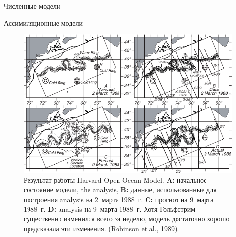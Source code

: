 \begin{chapter}{Численные модели}
\begin{section}{Ассимиляционные модели}
\begin{figure}[t!]
\includegraphics{pics/harvardmodelR}
\caption{Результат работы Harvard Open-Ocean Model.
\textbf{A:} начальное состояние модели, the analysis, 
\textbf{B:} данные, использованные для построения analysis 
на 2~марта 1988~г. 
\textbf{C:} прогноз на 9~марта 1988~г. 
\textbf{D:} analysis на 9~марта 1988~г.
Хотя Гольфстрим существенно изменился
всего за неделю, модель достаточно хорошо предсказала эти изменения. 
(Robinson et al., 1989).}
\label{fig:harvardmodel}
\end{figure}
%


\end{section}
\end{chapter}
